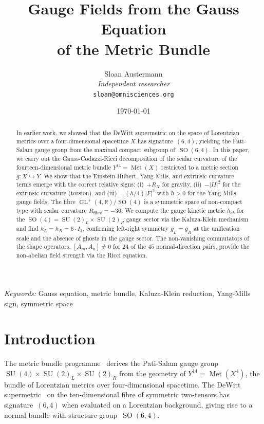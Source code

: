 \documentclass[12pt,a4paper]{article}
\title{\textbf{Gauge Fields from the Gauss Equation\\ of the Metric Bundle}}
\author{Sloan Austermann\\[4pt]
\small\textit{Independent researcher}\\
\small\texttt{sloan@omnisciences.org}}
\date{\today}
\theoremstyle{definition}
\newcommand{\Met}{\operatorname{Met}}
\newcommand{\GL}{\operatorname{GL}}
\newcommand{\SO}{\operatorname{SO}}
\newcommand{\SU}{\operatorname{SU}}
\newcommand{\R}{\mathbb{R}}
\begin{document}
\maketitle

\begin{abstract}
In earlier work, we showed that the DeWitt supermetric on the space of Lorentzian metrics over a four-dimensional spacetime $X$ has signature~$(6,4)$, yielding the Pati-Salam gauge group from the maximal compact subgroup of~$\SO(6,4)$.
In this paper, we carry out the Gauss-Codazzi-Ricci decomposition of the scalar curvature of the fourteen-dimensional metric bundle $Y^{14} = \Met(X)$ restricted to a metric section $g\colon X \hookrightarrow Y$.
We show that the Einstein-Hilbert, Yang-Mills, and extrinsic curvature terms emerge with the correct relative signs: (i)~$+R_X$ for gravity, (ii)~$-|II|^2$ for the extrinsic curvature (torsion), and (iii)~$-(h/4)|F|^2$ with $h > 0$ for the Yang-Mills gauge fields.
The fibre $\GL^+(4,\R)/\SO(4)$ is a symmetric space of non-compact type with scalar curvature $R_{\mathrm{fibre}} = -36$.
We compute the gauge kinetic metric $h_{ab}$ for the $\SO(4) = \SU(2)_L \times \SU(2)_R$ gauge sector via the Kaluza-Klein mechanism and find $h_L = h_R = 6\cdot I_3$, confirming left-right symmetry $g_L = g_R$ at the unification scale and the absence of ghosts in the gauge sector.
The non-vanishing commutators of the shape operators, $[A_m, A_n] \neq 0$ for $24$ of the $45$ normal-direction pairs, provide the non-abelian field strength via the Ricci equation.
\end{abstract}

\vspace{10pt}
\noindent\textit{Keywords:} Gauss equation, metric bundle, Kaluza-Klein reduction, Yang-Mills sign, symmetric space

\newpage
\tableofcontents
\newpage

\section{Introduction}
\label{sec:intro}

The metric bundle programme~\cite{Paper1,Paper2} derives the Pati-Salam gauge group $\SU(4) \times \SU(2)_L \times \SU(2)_R$ from the geometry of $Y^{14} = \Met(X^4)$, the bundle of Lorentzian metrics over four-dimensional spacetime.
The DeWitt supermetric~\cite{DeWitt1967} on the ten-dimensional fibre of symmetric two-tensors has signature~$(6,4)$ when evaluated on a Lorentzian background, giving rise to a normal bundle with structure group~$\SO(6,4)$.
\end{document}
